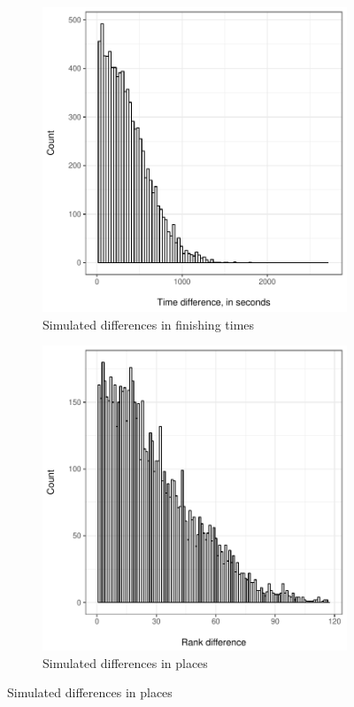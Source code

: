 \documentclass[12pt,titlepage]{article}
\begin{document}
\begin{figure}[!ht]
  \centering
  \caption{Distribution of simulated results for the Hahner twins}
  \label{fig:simdiff}
  \begin{subfigure}{.45\textwidth}
    \includegraphics[width=\textwidth,
    keepaspectratio]{simulated_time.pdf}
    \caption{Simulated differences in finishing times}
    \label{fig:simulatedfinishtimes}
  \end{subfigure}
  \begin{subfigure}{.45\textwidth}
    \includegraphics[width=\textwidth, keepaspectratio]{simulated_rank.pdf}
    \caption{Simulated differences in places}
    \label{fig:simulatedranks}
  \end{subfigure}
\end{figure}
\end{document}
